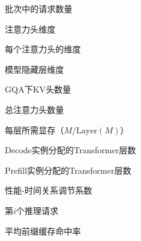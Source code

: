 \begin{denotation}[3cm]
  \item[$b$]批次中的请求数量
  \item[$d$]注意力头维度
  \item[$d_{\text{head}}$]每个注意力头的维度
  \item[$d_{\text{model}}$]模型隐藏层维度
  \item[$h_{kv}$]GQA下KV头数量
  \item[$h_{\text{total}}$]总注意力头数量
  \item[$m$]每层所需显存（$M/\text{Layer}(M)$）
  \item[$n_d$]Decode实例分配的Transformer层数
  \item[$n_p$]Prefill实例分配的Transformer层数
  \item[$p$]性能-时间关系调节系数
  \item[$q_i$]第$i$个推理请求
  \item[$r$]平均前缀缓存命中率


\end{denotation}
